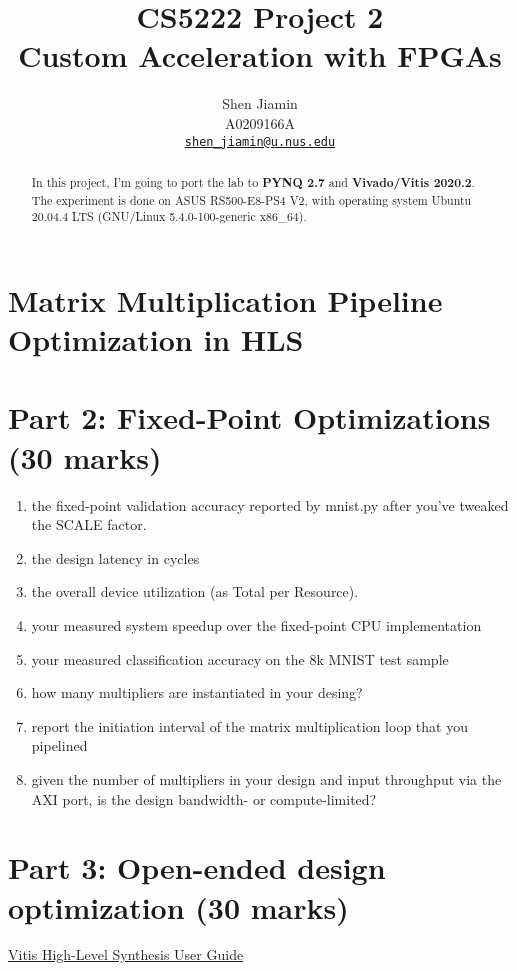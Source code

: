 \documentclass{article}
\begin{document}
\title{\bfseries
  CS5222 Project 2 \\
  Custom Acceleration with FPGAs\\
}

\author{
  Shen Jiamin \\
  A0209166A \\
  \href{mailto:shen_jiamin@u.nus.edu}{\nolinkurl{shen_jiamin@u.nus.edu}}
}

\maketitle

\begin{abstract}
  In this project, I'm going to port the lab to \textbf{PYNQ 2.7} and \textbf{Vivado/Vitis 2020.2}.
  The experiment is done on ASUS RS500-E8-PS4 V2, with operating system
  Ubuntu 20.04.4 LTS (GNU/Linux 5.4.0-100-generic x86\_64).
\end{abstract}


\section{Matrix Multiplication Pipeline Optimization in HLS}







\section{Part 2: Fixed-Point Optimizations (30 marks)}

\begin{enumerate}
  \item the fixed-point validation accuracy reported by mnist.py after you've tweaked the SCALE factor.
  \item the design latency in cycles
  \item the overall device utilization (as Total per Resource).
  \item your measured system speedup over the fixed-point CPU implementation
  \item your measured classification accuracy on the 8k MNIST test sample
  \item how many multipliers are instantiated in your desing?
  \item report the initiation interval of the matrix multiplication loop that you pipelined
  \item given the number of multipliers in your design and input throughput via the AXI port, is the design bandwidth- or compute-limited?
\end{enumerate}

\section{Part 3: Open-ended design optimization (30 marks)}

\href{https://www.xilinx.com/support/documentation/sw_manuals/xilinx2020_2/ug1399-vitis-hls.pdf}{Vitis High-Level Synthesis User Guide}


% 
% 

\clearpage
\appendix
\end{document}
